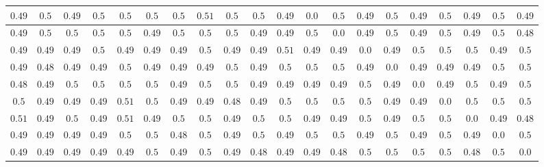 \begin{table}[h!]
{\begin{tabular}{cccccccccccccccccccc}
$0.49$ & $0.5$ & $0.49$ & $0.5$ & $0.5$ & $0.5$ & $0.5$ & $0.51$ & $0.5$ & $0.5$ & $0.49$ & $0.0$ & $0.5$ & $0.49$ & $0.5$ & $0.49$ & $0.5$ & $0.49$ & $0.5$ & $0.49$\\ \hline
$0.49$ & $0.5$ & $0.5$ & $0.5$ & $0.5$ & $0.49$ & $0.5$ & $0.5$ & $0.5$ & $0.49$ & $0.49$ & $0.5$ & $0.0$ & $0.49$ & $0.5$ & $0.49$ & $0.5$ & $0.49$ & $0.5$ & $0.48$\\ \hline
$0.49$ & $0.49$ & $0.49$ & $0.5$ & $0.49$ & $0.49$ & $0.49$ & $0.5$ & $0.49$ & $0.49$ & $0.51$ & $0.49$ & $0.49$ & $0.0$ & $0.49$ & $0.5$ & $0.5$ & $0.5$ & $0.49$ & $0.5$\\ \hline
$0.49$ & $0.48$ & $0.49$ & $0.49$ & $0.5$ & $0.49$ & $0.49$ & $0.49$ & $0.5$ & $0.49$ & $0.5$ & $0.5$ & $0.5$ & $0.49$ & $0.0$ & $0.49$ & $0.49$ & $0.49$ & $0.5$ & $0.5$\\ \hline
$0.48$ & $0.49$ & $0.5$ & $0.5$ & $0.5$ & $0.5$ & $0.49$ & $0.5$ & $0.5$ & $0.49$ & $0.49$ & $0.49$ & $0.49$ & $0.5$ & $0.49$ & $0.0$ & $0.49$ & $0.5$ & $0.49$ & $0.5$\\ \hline
$0.5$ & $0.49$ & $0.49$ & $0.49$ & $0.51$ & $0.5$ & $0.49$ & $0.49$ & $0.48$ & $0.49$ & $0.5$ & $0.5$ & $0.5$ & $0.5$ & $0.49$ & $0.49$ & $0.0$ & $0.5$ & $0.5$ & $0.5$\\ \hline
$0.51$ & $0.49$ & $0.5$ & $0.49$ & $0.51$ & $0.49$ & $0.5$ & $0.5$ & $0.49$ & $0.5$ & $0.5$ & $0.49$ & $0.49$ & $0.5$ & $0.49$ & $0.5$ & $0.5$ & $0.0$ & $0.49$ & $0.48$\\ \hline
$0.49$ & $0.49$ & $0.49$ & $0.49$ & $0.5$ & $0.5$ & $0.48$ & $0.5$ & $0.49$ & $0.5$ & $0.49$ & $0.5$ & $0.5$ & $0.49$ & $0.5$ & $0.49$ & $0.5$ & $0.49$ & $0.0$ & $0.5$\\ \hline
$0.49$ & $0.49$ & $0.49$ & $0.49$ & $0.49$ & $0.5$ & $0.49$ & $0.5$ & $0.49$ & $0.48$ & $0.49$ & $0.49$ & $0.48$ & $0.5$ & $0.5$ & $0.5$ & $0.5$ & $0.48$ & $0.5$ & $0.0$
\end{tabular}}
\end{table}

